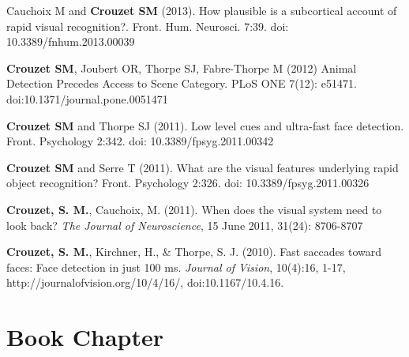 \documentclass[margin,line]{resume}
\begin{document}
\begin{resume}


	

Cauchoix M and \textbf{Crouzet SM} (2013). How plausible is a subcortical account of rapid visual recognition?. Front. Hum. Neurosci. 7:39. doi: 10.3389/fnhum.2013.00039
	
	\vspace{-2mm} \textbf{Crouzet SM}, Joubert OR, Thorpe SJ, Fabre-Thorpe M (2012) Animal Detection Precedes Access to Scene Category. PLoS ONE 7(12): e51471. doi:10.1371/journal.pone.0051471

	\vspace{-2mm} \textbf{Crouzet SM} and Thorpe SJ (2011). Low level cues and ultra-fast face detection. Front. Psychology 2:342. doi: 10.3389/fpsyg.2011.00342

	\vspace{-2mm} \textbf{Crouzet SM} and Serre T (2011). What are the visual features underlying rapid object recognition? Front. Psychology 2:326. doi: 10.3389/fpsyg.2011.00326

	\vspace{-2mm} \textbf{Crouzet, S. M.}, Cauchoix, M. (2011). When does the visual system need to look back?  \textit{The Journal of Neuroscience}, 15 June 2011, 31(24): 8706-8707

	\vspace{-2mm} \textbf{Crouzet, S. M.}, Kirchner, H., \& Thorpe, S. J.  (2010). Fast saccades toward faces: Face detection in just 100 ms. \textit{Journal of Vision}, 10(4):16, 1-17, http://journalofvision.org/10/4/16/, doi:10.1167/10.4.16.
	
	\newpage

	\vspace{3mm}	
    \section{\mysidestyle Book Chapter}


\end{resume}
\end{document}
